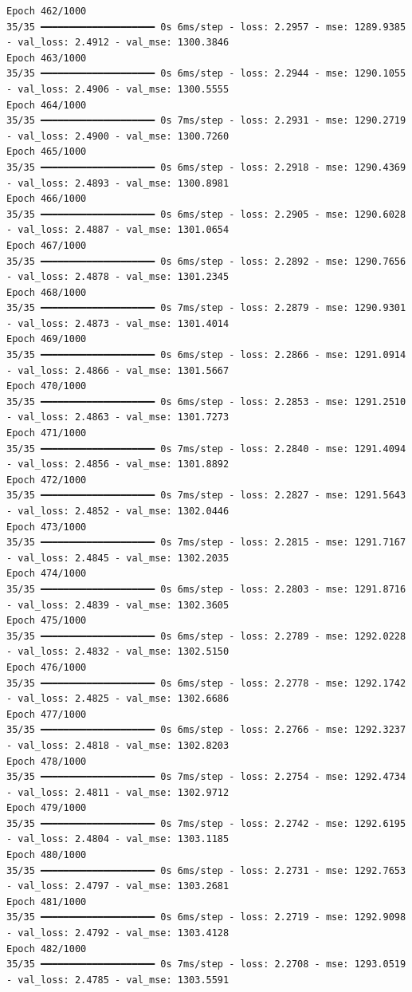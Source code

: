 \documentclass[
  letterpaper,
  DIV=11,
  numbers=noendperiod]{scrreprt}
\begin{document}
\begin{verbatim}
Epoch 462/1000
35/35 ━━━━━━━━━━━━━━━━━━━━ 0s 6ms/step - loss: 2.2957 - mse: 1289.9385 - val_loss: 2.4912 - val_mse: 1300.3846
Epoch 463/1000
35/35 ━━━━━━━━━━━━━━━━━━━━ 0s 6ms/step - loss: 2.2944 - mse: 1290.1055 - val_loss: 2.4906 - val_mse: 1300.5555
Epoch 464/1000
35/35 ━━━━━━━━━━━━━━━━━━━━ 0s 7ms/step - loss: 2.2931 - mse: 1290.2719 - val_loss: 2.4900 - val_mse: 1300.7260
Epoch 465/1000
35/35 ━━━━━━━━━━━━━━━━━━━━ 0s 6ms/step - loss: 2.2918 - mse: 1290.4369 - val_loss: 2.4893 - val_mse: 1300.8981
Epoch 466/1000
35/35 ━━━━━━━━━━━━━━━━━━━━ 0s 6ms/step - loss: 2.2905 - mse: 1290.6028 - val_loss: 2.4887 - val_mse: 1301.0654
Epoch 467/1000
35/35 ━━━━━━━━━━━━━━━━━━━━ 0s 6ms/step - loss: 2.2892 - mse: 1290.7656 - val_loss: 2.4878 - val_mse: 1301.2345
Epoch 468/1000
35/35 ━━━━━━━━━━━━━━━━━━━━ 0s 7ms/step - loss: 2.2879 - mse: 1290.9301 - val_loss: 2.4873 - val_mse: 1301.4014
Epoch 469/1000
35/35 ━━━━━━━━━━━━━━━━━━━━ 0s 6ms/step - loss: 2.2866 - mse: 1291.0914 - val_loss: 2.4866 - val_mse: 1301.5667
Epoch 470/1000
35/35 ━━━━━━━━━━━━━━━━━━━━ 0s 6ms/step - loss: 2.2853 - mse: 1291.2510 - val_loss: 2.4863 - val_mse: 1301.7273
Epoch 471/1000
35/35 ━━━━━━━━━━━━━━━━━━━━ 0s 7ms/step - loss: 2.2840 - mse: 1291.4094 - val_loss: 2.4856 - val_mse: 1301.8892
Epoch 472/1000
35/35 ━━━━━━━━━━━━━━━━━━━━ 0s 7ms/step - loss: 2.2827 - mse: 1291.5643 - val_loss: 2.4852 - val_mse: 1302.0446
Epoch 473/1000
35/35 ━━━━━━━━━━━━━━━━━━━━ 0s 7ms/step - loss: 2.2815 - mse: 1291.7167 - val_loss: 2.4845 - val_mse: 1302.2035
Epoch 474/1000
35/35 ━━━━━━━━━━━━━━━━━━━━ 0s 6ms/step - loss: 2.2803 - mse: 1291.8716 - val_loss: 2.4839 - val_mse: 1302.3605
Epoch 475/1000
35/35 ━━━━━━━━━━━━━━━━━━━━ 0s 6ms/step - loss: 2.2789 - mse: 1292.0228 - val_loss: 2.4832 - val_mse: 1302.5150
Epoch 476/1000
35/35 ━━━━━━━━━━━━━━━━━━━━ 0s 6ms/step - loss: 2.2778 - mse: 1292.1742 - val_loss: 2.4825 - val_mse: 1302.6686
Epoch 477/1000
35/35 ━━━━━━━━━━━━━━━━━━━━ 0s 6ms/step - loss: 2.2766 - mse: 1292.3237 - val_loss: 2.4818 - val_mse: 1302.8203
Epoch 478/1000
35/35 ━━━━━━━━━━━━━━━━━━━━ 0s 7ms/step - loss: 2.2754 - mse: 1292.4734 - val_loss: 2.4811 - val_mse: 1302.9712
Epoch 479/1000
35/35 ━━━━━━━━━━━━━━━━━━━━ 0s 7ms/step - loss: 2.2742 - mse: 1292.6195 - val_loss: 2.4804 - val_mse: 1303.1185
Epoch 480/1000
35/35 ━━━━━━━━━━━━━━━━━━━━ 0s 6ms/step - loss: 2.2731 - mse: 1292.7653 - val_loss: 2.4797 - val_mse: 1303.2681
Epoch 481/1000
35/35 ━━━━━━━━━━━━━━━━━━━━ 0s 6ms/step - loss: 2.2719 - mse: 1292.9098 - val_loss: 2.4792 - val_mse: 1303.4128
Epoch 482/1000
35/35 ━━━━━━━━━━━━━━━━━━━━ 0s 7ms/step - loss: 2.2708 - mse: 1293.0519 - val_loss: 2.4785 - val_mse: 1303.5591

\end{verbatim}
\end{document}
